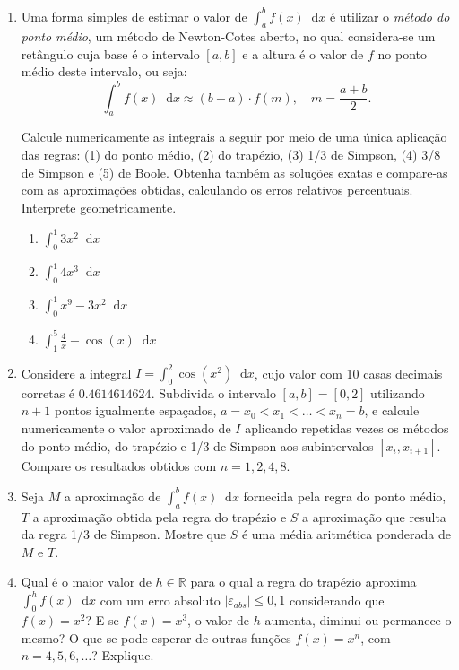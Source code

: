 \documentclass[12pt,a4paper]{article}
\newcommand*\diff{\mathop{}\!\mathrm{d}}
\begin{document}
\begin{enumerate}
\item Uma forma simples de estimar o valor de $\int_a^b f(x)\diff{x}$ é utilizar o \textit{método do ponto médio}, um método de Newton-Cotes aberto, no qual considera-se um retângulo cuja base é o intervalo $[a,b]$ e a altura é o valor de $f$ no ponto médio deste intervalo, ou seja:
\[
\int_a^b f(x)\diff{x} \approx (b-a) \cdot f\left(m \right),
\quad
m = \frac{a+b}{2}.
\]

Calcule numericamente as integrais a seguir por meio de uma única aplicação das regras: (1) do ponto médio, (2) do trapézio, (3) 1/3 de Simpson, (4) 3/8 de Simpson e (5) de Boole. Obtenha também as soluções exatas e compare-as com as aproximações obtidas, calculando os erros relativos percentuais. Interprete geometricamente.
\begin{multicols}{4}
\begin{enumerate}
\item $\int_0^1 3x^2 \diff{x}$
\item $\int_0^1 4x^3 \diff{x}$
\item $\int_{0}^1 x^9 - 3x^2 \diff{x}$
\item $\int_{1}^5 \frac{4}{x} - \cos(x) \diff{x}$
\end{enumerate}
\end{multicols}

\item Considere a integral $I = \int_0^2 \cos(x^2)\diff{x}$, cujo valor com 10 casas decimais corretas é $0.4614614624$. Subdivida o intervalo $[a, b] = [0, 2]$ utilizando $n+1$ pontos igualmente espaçados, $a = x_0 < x_1 < \ldots < x_n = b$, e calcule numericamente o valor aproximado de $I$ aplicando repetidas vezes os métodos do ponto médio, do trapézio e 1/3 de Simpson aos subintervalos $[x_i,x_{i+1}]$. Compare os resultados obtidos com $n = 1, 2, 4, 8$.

\item Seja $M$ a aproximação de $\int_a^b f(x)\diff{x}$ fornecida pela regra do ponto médio, $T$ a aproximação obtida pela regra do trapézio e $S$ a aproximação que resulta da regra 1/3 de Simpson. Mostre que $S$ é uma média aritmética ponderada de $M$ e $T$.

\item Qual é o maior valor de $h \in \mathbb{R}$ para o qual a regra do trapézio aproxima $\int_0^h f(x) \diff{x}$ com um erro absoluto $|\varepsilon_{abs}| \leq 0,1$ considerando que $f(x) = x^2$? E se $f(x) = x^3$, o valor de $h$ aumenta, diminui ou permanece o mesmo? O que se pode esperar de outras funções $f(x) = x^n$, com $n = 4,5,6,\ldots$? Explique.


\end{enumerate}
\end{document}
